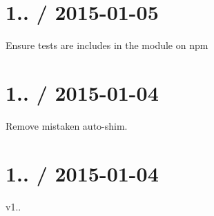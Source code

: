 \section*{1.. / 2015-\/01-\/05 }


\begin{DoxyItemize}
\item Ensure tests are includes in the module on {\ttfamily npm}
\end{DoxyItemize}

\section*{1.. / 2015-\/01-\/04 }


\begin{DoxyItemize}
\item Remove mistaken auto-\/shim.
\end{DoxyItemize}

\section*{1.. / 2015-\/01-\/04 }


\begin{DoxyItemize}
\item v1.. 
\end{DoxyItemize}